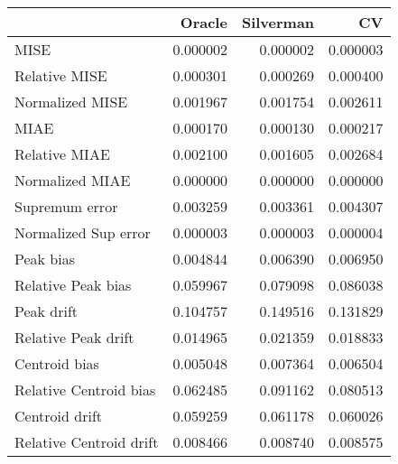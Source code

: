 \begin{tabular}{lrrr}
  \toprule
 & Oracle & Silverman & CV \\ 
  \midrule
MISE & 0.000002 & 0.000002 & 0.000003 \\ 
  Relative MISE & 0.000301 & 0.000269 & 0.000400 \\ 
  Normalized MISE & 0.001967 & 0.001754 & 0.002611 \\ 
  MIAE & 0.000170 & 0.000130 & 0.000217 \\ 
  Relative MIAE & 0.002100 & 0.001605 & 0.002684 \\ 
  Normalized MIAE & 0.000000 & 0.000000 & 0.000000 \\ 
  Supremum error & 0.003259 & 0.003361 & 0.004307 \\ 
  Normalized Sup error & 0.000003 & 0.000003 & 0.000004 \\ 
  Peak bias & 0.004844 & 0.006390 & 0.006950 \\ 
  Relative Peak bias & 0.059967 & 0.079098 & 0.086038 \\ 
  Peak drift & 0.104757 & 0.149516 & 0.131829 \\ 
  Relative Peak drift & 0.014965 & 0.021359 & 0.018833 \\ 
  Centroid bias & 0.005048 & 0.007364 & 0.006504 \\ 
  Relative Centroid bias & 0.062485 & 0.091162 & 0.080513 \\ 
  Centroid drift & 0.059259 & 0.061178 & 0.060026 \\ 
  Relative Centroid drift & 0.008466 & 0.008740 & 0.008575 \\ 
   \bottomrule
\end{tabular}
